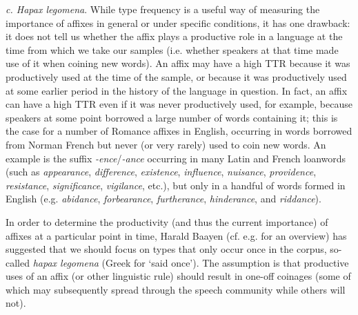\textit{c. Hapax legomena}.  While type frequency  is a useful way of measuring  the importance of affixes  in general or under specific conditions, it has one drawback: it does not tell us whether the affix  plays a productive  role in a language at the time from which we take our samples (i.e. whether speakers at that time made use of it when coining new words). An affix  may have a high TTR  because it was productively used at the time of the sample, or because it was productively used at some earlier period in the history of the language in question. In fact, an affix  can have a high TTR even if it was never productively  used, for example, because speakers at some point borrowed a large number of words containing it; this is the case for a number of Romance affixes  in English, occurring in words borrowed from Norman French but never (or very rarely) used to coin new words. An example is the  suffix \textit{-ence}\slash \textit{-ance} occurring in many Latin and French loanwords (such as \textit{appearance}, \textit{difference}, \textit{existence}, \textit{influence}, \textit{nuisance}, \textit{providence}, \textit{resistance}, \textit{significance}, \textit{vigilance}, etc.), but only in a handful of words formed in English (e.g. \textit{abidance}, \textit{forbearance}, \textit{furtherance}, \textit{hinderance}, and \textit{riddance}).

In order to determine the productivity  (and thus the current importance) of affixes  at a particular point in time, Harald Baayen (cf. e.g. \citealt{baayen_41._2009} for an overview) has suggested that we should focus on types  that only occur once in the corpus, so\hyp{}called \textit{hapax legomena}  (Greek for `said once'). The assumption is that productive  uses of an affix  (or other linguistic rule) should result in one\hyp{}off coinages (some of which may subsequently spread through the speech community while others will not).

